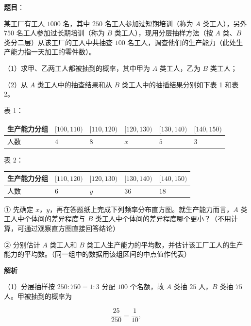 \begin{answer}

\textbf{题目}：

某工厂有工人 $1000$ 名，其中 $250$ 名工人参加过短期培训（称为 $A$ 类工人），另外 $750$ 名工人参加过长期培训（称为 $B$ 类工人），现用分层抽样方法（按 $A$ 类、$B$ 类分二层）从该工厂的工人中共抽查 $100$ 名工人，调查他们的生产能力（此处生产能力指一天加工的零件数）。

（1）求甲、乙两工人都被抽到的概率，其中甲为 $A$ 类工人，乙为 $B$ 类工人；

（2）从 $A$ 类工人中的抽查结果和从 $B$ 类工人中的抽插结果分别如下表 1 和表 2。

表 1：

\begin{center}
\begin{tabular}{llllll}
\toprule
生产能力分组 & $[100,110)$ & $[110,120)$ & $[120,130)$ & $[130,140)$ & $[140,150)$ \\
\midrule
人数 & $4$ & $8$ & $x$ & $5$ & $3$ \\
\bottomrule
\end{tabular}
\end{center}

表 2：

\begin{center}
\begin{tabular}{lllll}
\toprule
生产能力分组 & $[110,120)$ & $[120,130)$ & $[130,140)$ & $[140,150)$ \\
\midrule
人数 & $6$ & $y$ & $36$ & $18$ \\
\bottomrule
\end{tabular}
\end{center}

① 先确定 $x$，$y$，再在答题纸上完成下列频率分布直方图。就生产能力而言，$A$ 类工人中个体间的差异程度与 $B$ 类工人中个体间的差异程度哪个更小？（不用计算，可通过观察直方图直接回答结论）
\nopagebreak[4]
\begin{center}\end{center}
\nopagebreak[4]
② 分别估计 $A$ 类工人和 $B$ 类工人生产能力的平均数，并估计该工厂工人的生产能力的平均数。（同一组中的数据用该组区间的中点值作代表）

\textbf{解析}

（1）分层抽样按 $250:750=1:3$ 分配 $100$ 个名额，故 $A$ 类抽 $25$ 人，$B$ 类抽 $75$ 人。甲被抽到的概率为

\nopagebreak[4]
\[\frac{25}{250}=\frac1{10},\]


\end{answer}
